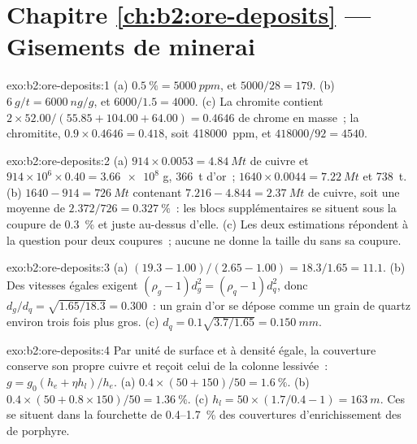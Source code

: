 \section*{Chapitre \ref{ch:b2:ore-deposits} --- Gisements de minerai}

\begin{solution}{exo:b2:ore-deposits:1}
(a) $\qty{0.5}{\percent} = \qty{5000}{ppm}$, et $5000/28 = 179$. (b) $\qty{6}{g/t} = \qty{6000}{ng/g}$,
et $6000/1.5 = 4000$. (c) La chromite contient $2 \times 52.00/(55.85 + 104.00 + 64.00) = 0.4646$
de chrome en masse~; la chromitite,
$0.9 \times 0.4646 = 0.418$, soit \qty{418000}{ppm}, et $418000/92 = 4540$.
\end{solution}

\begin{solution}{exo:b2:ore-deposits:2}
(a) $914 \times 0.0053 = \qty{4.84}{Mt}$ de cuivre et $914 \times 10^6 \times 0.40 = \num{3.66e8}$ g,
\qty{366}{t} d'or~; $1640 \times 0.0044 = \qty{7.22}{Mt}$ et \qty{738}{t}. (b) $1640 - 914 =
\qty{726}{Mt}$ contenant $7.216 - 4.844 = \qty{2.37}{Mt}$ de cuivre, soit une  moyenne de
$2.372/726 = \qty{0.327}{\percent}$~: les blocs supplémentaires se situent sous la coupure de \qty{0.3}{\percent}
et juste au-dessus d'elle. (c) Les deux estimations répondent à la question pour deux coupures~; aucune ne donne la taille
du  sans sa coupure.
\end{solution}

\begin{solution}{exo:b2:ore-deposits:3}
(a) $(19.3 - 1.00)/(2.65 - 1.00) = 18.3/1.65 = 11.1$. (b) Des vitesses égales exigent $(\rho_g - 1)d_g^2 =
(\rho_q - 1)d_q^2$, donc $d_g/d_q = \sqrt{1.65/18.3} = 0.300$~: un grain d'or se dépose comme un grain de quartz
environ trois fois plus gros. (c) $d_q = 0.1\sqrt{3.7/1.65} = \qty{0.150}{mm}$.
\end{solution}

\begin{solution}{exo:b2:ore-deposits:4}
Par unité de surface et à densité égale, la couverture conserve son propre cuivre et reçoit celui de la colonne
lessivée~: $g = g_0(h_e + \eta h_l)/h_e$. (a) $0.4 \times (50 + 150)/50 = \qty{1.6}{\percent}$.
(b) $0.4 \times (50 + 0.8 \times 150)/50 = \qty{1.36}{\percent}$. (c) $h_l = 50 \times (1.7/0.4 - 1)
= \qty{163}{m}$. Ces  se situent dans la fourchette de 0.4--\qty{1.7}{\percent} des couvertures
d'enrichissement des  de porphyre.
\end{solution}

